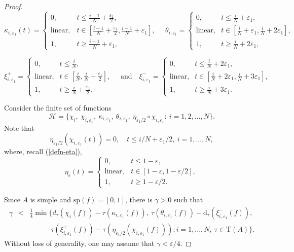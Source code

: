 \documentclass[12pt, oneside, psamsfonts]{amsart}
\theoremstyle{definition}
\theoremstyle{remark}
\numberwithin{equation}{section}
\newcommand{\eps}{\varepsilon}
\newcommand{\tr}{\mathrm{T}}
\begin{document}
\begin{proof}
$$\kappa_{i, \eps_1}(t) = 
\left\{ 
\begin{array}{ll}
0, & t \leq \frac{i-1}{N} + \frac{\eps_1}{2}, \\
\mathrm{linear}, & t \in [\frac{i-1}{N} +\frac{\eps_1}{2}, \frac{i-1}{N} +\eps_1], \\
1, & t \geq \frac{i-1}{N} + \eps_1,
\end{array}
\right.
\quad
\theta_{i, \eps_1} = 
\left\{
\begin{array}{ll}
0, & t \leq \frac{i}{N} + \eps_1, \\
\textrm{linear}, & t \in [\frac{i}{N} + \eps_1, \frac{i}{N} + 2\eps_1], \\
1, & t \geq \frac{i}{N} + 2 \eps_1,
\end{array}
\right.
$$

$$
\xi_{i, \eps_1}^{+} = 
\left\{
\begin{array}{ll}
0, & t \leq \frac{i}{N}, \\
\textrm{linear}, & t \in [\frac{i}{N}, \frac{i}{N} + \frac{\eps_1}{2}], \\
1, & t \geq \frac{i}{N} + \frac{\eps_1}{2},
\end{array}
\right.
\quad 
\mathrm{and}
\quad
\xi_{i, \eps_1}^{-} = 
\left\{
\begin{array}{ll}
0, & t \leq \frac{i}{N} + 2\eps_1, \\
\textrm{linear}, & t \in [\frac{i}{N} + 2\eps_1, \frac{i}{N} + 3\eps_1], \\
1, & t \geq \frac{i}{N} + 3\eps_1.
\end{array}
\right.
$$



Consider the finite set of functions 
\begin{equation}
\mathcal H = \{\chi_i,\  \chi_{i, \eps_1},\ \kappa_{i, \eps_1},\ \theta_{i, \eps_1},\ \eta_{\eps_1/2}\circ \chi_{i, \eps_1}:\ i=1, 2, ..., N\}.
\end{equation}
Note that $$\eta_{\eps_1/2}(\chi_{i, \eps_1}(t)) = 0,\quad t \leq i/N+\eps_1/2,\ i=1, ..., N,$$
where, recall (\eqref{defn-eta}),
$$
\eta_\eps(t) = \left\{
\begin{array}{ll}
0, & t \leq 1-\eps, \\
\mathrm{linear}, & t \in [1-\eps, 1-\eps/2], \\
1, & t \geq 1-\eps/2.
\end{array}
\right.
$$


Since $A$ is simple and $\mathrm{sp}(f) = [0, 1]$, there is $\gamma > 0$ such that
\begin{eqnarray}\label{small-gap}
\gamma & < & \frac{1}{4}\min\{d_\tau(\chi_i(f)) - \tau(\kappa_{i, \eps_1}(f)), \ \tau(\theta_{i, \eps_1}(f)) - \mathrm{d}_\tau(\xi_{i, \eps_1}^-(f)),\\
& & \quad \quad \quad  \tau(\xi^+_{i, \eps_1}(f)) - \tau(\eta_{\eps_1/2}(\chi_{i, \eps_1}(f))): i=1, ..., N,\ \tau\in\tr(A)\}. \nonumber 
\end{eqnarray}
Without loss of generality, one may assume that $\gamma < \eps/4$. 



\end{proof}
\end{document}
